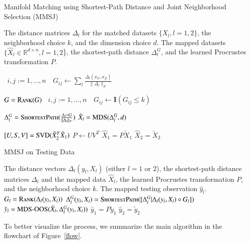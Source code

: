 \documentclass[times,twocolumn,final]{elsarticle}
\newcommand{\Linefor}[2]{%
    \State \algorithmicfor\ {#1}\ \algorithmicdo\ {#2} \algorithmicend\ \algorithmicfor%
}
\newcommand{\rto}{\leftarrow}
\providecommand{\mb}[1]{\boldsymbol{#1}}
\begin{document}
\begin{algorithm}
\caption{Manifold Matching using Shortest-Path Distance and Joint Neighborhood Selection (MMSJ)}
\label{alg1}
\begin{algorithmic}[1]
\Require The distance matrices $\Delta_{l}$ for the matched datasets $\{X_{l}, l=1,2\}$, the neighborhood choice $k$, and the dimension choice $d$.
\Ensure The mapped datasets $\{\hat{X}_{l} \in \mathbb{R}^{d \times n}, l=1,2$\}, the shortest-path distance $\Delta_{l}^{G}$, and the learned Procrustes transformation $P$.

\Linefor{$i,j:=1,\ldots,n$}{$G_{ij} \rto \sum_{l} \frac{\Delta_{l}(x_{il},x_{jl})}{\|\Delta_{l}\|_{F}}$} 
\State $G = \textsc{Rank}(G)$ 
\Linefor{$i,j:=1,\ldots,n$}{$G_{ij} \rto \mb{I}(G_{ij} \leq k)$} 
\State $\Delta_{l}^{G} = \textsc{ShortestPath}(\frac{\Delta_{l} \circ G }{\|\Delta_{l}\|_{F}})$ 
\State $\tilde{X}_{l}=\textsc{MDS}(\Delta_{l}^{G},d)$ 
\EndFor

\State $[U,S,V]=\textsc{SVD}(\tilde{X}_{2}^{T}\tilde{X}_{1})$
\State $P \rto UV^{T}$ 
\State $\hat{X}_{1}=P \tilde{X}_{1}$
\State $\hat{X}_{2}=\tilde{X}_{2}$
\EndFunction
\end{algorithmic}
\end{algorithm}

\begin{algorithm}
\caption{MMSJ on Testing Data}
\label{alg2}
\begin{algorithmic}[1]
\Require The distance vectors $\Delta_{l}(y_{l},X_{l})$ (either $l=1$ or $2$), the shortest-path distance matrices $\Delta_{l}$ and the mapped data $\hat{X}_{l}$, the learned Procrustes transformation $P$, and the neighborhood choice $k$.
\Ensure The mapped testing observation $\hat{y}_{l}$. 
\State $G_{l} = \textsc{Rank}(\Delta_{l}(y_{l},X_{l}))$
\State $\Delta_{l}^{G}(y_{l},X_{l}) = \textsc{ShortestPath}([\Delta_{l}^{G} | \Delta_{l}(y_{l},X_{l}) \circ G_{l}])$ 
\State $\tilde{y}_{l}=\textsc{MDS-OOS}(\hat{X}_{l},\Delta_{l}^{G}(y_{l},X_{l}))$
\State $\hat{y}_{1}=P \tilde{y}_{1}$
\Else
\State $\hat{y}_{2}=\tilde{y}_{2}$
\EndIf
\EndFunction
\end{algorithmic}
\end{algorithm}

To better visualize the process, we summarize the main algorithm in the flowchart of Figure~\ref{flow}. 
\end{document}
